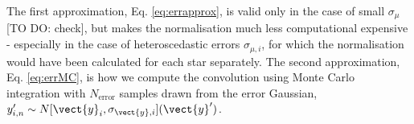 The first approximation, Eq. \ref{eq:errapprox}, is valid only in the case of small $\sigma_\mu$ [TO DO: check], but makes the normalisation much less computational expensive - especially in the case of heteroscedastic errors $\sigma_{\mu,i}$, for which the normalisation would have been calculated for each star separately. The second approximation, Eq. \ref{eq:errMC}, is how we compute the convolution using Monte Carlo integration with $N_\text{error}$ samples drawn from the error Gaussian, $y'_{i,n} \sim N[\vect{y}_i,\sigma_{\vect{y},i}](\vect{y}')$.
